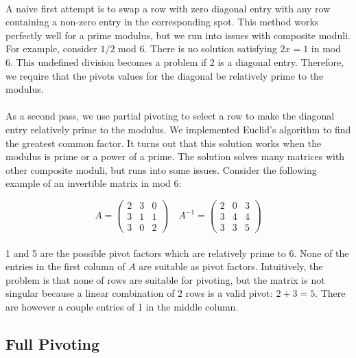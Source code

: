 \documentclass[11pt]{article}
\begin{document}
\paragraph{} A naive first attempt is to swap a row with zero diagonal entry with any row containing a non-zero entry in the corresponding spot.  This method works perfectly well for a prime modulus, but we run into issues with composite moduli.  For example, consider $1 / 2$ mod 6.  There is no solution satisfying $2x = 1$ in mod 6.  This undefined division becomes a problem if 2 is a diagonal entry.  Therefore, we require that the pivots values for the diagonal be relatively prime to the modulus.


\paragraph{} As a second pass, we use partial pivoting to select a row to make the diagonal entry relatively prime to the modulus.  We implemented Euclid’s algorithm to find the greatest common factor.  It turns out that this solution works when the modulus is prime or a power of a prime.  The solution solves many matrices with other composite moduli, but runs into some issues.  Consider the following example of an invertible matrix in mod 6:

\[
A =
\begin{pmatrix}
2 & 3 & 0 \\
3 & 1 & 1 \\
3 & 0 & 2
\end{pmatrix}
\quad
A^{-1} =
\begin{pmatrix}
2 & 0 & 3 \\
3 & 4 & 4 \\
3 & 3 & 5
\end{pmatrix}
\]

\paragraph{} 1 and 5 are the possible pivot factors which are relatively prime to 6.  None of the entries in the first column of $A$ are suitable as pivot factors.  Intuitively, the problem is that none of rows are suitable for pivoting, but the matrix is not singular because a linear combination of 2 rows is a valid pivot: $2 + 3 = 5$.  There are however a couple entries of 1 in the middle column.

\subsection*{Full Pivoting}
\end{document}
